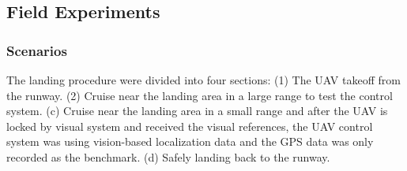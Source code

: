  
 

\subsection{Field Experiments}
\subsubsection{Scenarios}

The landing procedure were divided into four sections: (1) The UAV takeoff from the runway. (2) Cruise near the landing area in a large range to test the control system. (c) Cruise near the landing area in a small range and after the UAV is locked by visual system and received the visual references, the UAV control system was using vision-based localization data and the GPS data was only recorded as the benchmark. (d) Safely landing back to the runway.

 




